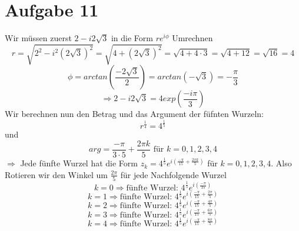 \section{Aufgabe 11}
Wir müssen zuerst $2-i2\sqrt{3}$ in die Form $re^{i\phi}$ Umrechnen
$$r = \sqrt{2^2 - i^2 (2\sqrt{3})^2} = \sqrt{4+(2\sqrt{3})^2}=\sqrt{4+4\cdot3}=\sqrt{4+12}=\sqrt{16}=4$$
$$\phi = arctan(\frac{-2\sqrt{3}}{2}) = arctan(-\sqrt{3}) = -\frac{\pi}{3}$$
$$\Rightarrow 2-i2\sqrt{3} = 4exp(\frac{-i\pi}{3})$$
Wir berechnen nun den Betrag und das Argument der füfnten Wurzeln: 
$$r^{\frac{1}{4}}=4^{\frac{1}{5}}$$
und
$$arg=\frac{-\pi}{3 \cdot 5}+\frac{2\pi k}{5} \text{ für } k=0,1,2,3,4$$
$\Rightarrow$ Jede fünfte Wurzel hat die Form $z_k = 4^{\frac{1}{5}}e^{i(\frac{-\pi}{15}+\frac{2\pi k}{5})}$ für $k=0,1,2,3,4$. Also Rotieren wir den Winkel um $\frac{2\pi}{5}$ für jede Nachfolgende Wurzel
$$k=0 \Rightarrow \text{fünfte Wurzel: } 4^{\frac{1}{5}}e^{i(\frac{-\pi}{15})}$$
$$k=1 \Rightarrow \text{fünfte Wurzel: } 4^{\frac{1}{5}}e^{i(\frac{-\pi}{15}+\frac{2\pi}{5})}$$
$$k=2 \Rightarrow \text{fünfte Wurzel: } 4^{\frac{1}{5}}e^{i(\frac{-\pi}{15}+\frac{4\pi}{5})}$$
$$k=3 \Rightarrow \text{fünfte Wurzel: } 4^{\frac{1}{5}}e^{i(\frac{-\pi}{15}+\frac{6\pi}{5})}$$
$$k=4 \Rightarrow \text{fünfte Wurzel: } 4^{\frac{1}{5}}e^{i(\frac{-\pi}{15}+\frac{8\pi}{5})}$$